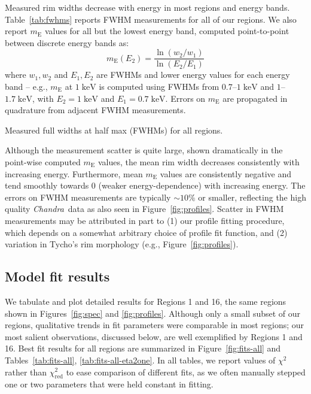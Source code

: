 \documentclass[iop, apj, numberedappendix]{emulateapj}
\newcommand*{\mt}{\mathrm}
\newcommand*{\unit}[1]{\;\mt{#1}}  %
\newcommand*{\abt}{\mathord{\sim}} %
\newcommand*{\Chandra}{\textit{Chandra}\ }
\newcommand*{\mE}{m_\mt{E}}
\begin{document}
Measured rim widths decrease with energy in most regions and energy bands.
Table~\ref{tab:fwhms} reports FWHM measurements for all of our regions.
We also report $\mE$ values for all but the lowest energy band, computed
point-to-point between discrete energy bands as:
\begin{equation}
    \mE(E_2) = \frac{\ln(w_2/w_1)}{\ln(E_2/E_1)}
\end{equation}
where $w_1, w_2$ and $E_1, E_2$ are FWHMs and lower energy values for each
energy band -- e.g., $\mE$ at $1 \unit{keV}$ is computed using FWHMs from
$0.7$--$1 \unit{keV}$ and $1$--$1.7 \unit{keV}$, with $E_2 = 1 \unit{keV}$ and
$E_1 = 0.7 \unit{keV}$.  Errors on $\mE$ are propagated in quadrature from
adjacent FWHM measurements.

\begin{table*}
    \iftoggle{manuscript}{
        \tiny
    }{
        \scriptsize
    }
    \centering
    \caption{Measured full widths at half max (FWHMs) for all regions.
             \label{tab:fwhms}}
    
\end{table*}

Although the measurement scatter is quite large, shown dramatically in the
point-wise computed $\mE$ values, the mean rim width decreases consistently
with increasing energy.  Furthermore, mean $\mE$ values are consistently
negative and tend smoothly towards $0$ (weaker energy-dependence) with
increasing energy.  The errors on FWHM measurements are typically $\abt 10\%$
or smaller, reflecting the high quality \Chandra data as also seen in
Figure~\ref{fig:profiles}.  Scatter in FWHM measurements may be attributed in
part to (1) our profile fitting procedure, which depends on a somewhat
arbitrary choice of profile fit function, and (2) variation in Tycho's rim
morphology (e.g., Figure~\ref{fig:profiles}).

\subsection{Model fit results}
\label{sec:fit-results}

We tabulate and plot detailed results for Regions 1 and 16, the same regions
shown in Figures~\ref{fig:spec} and \ref{fig:profiles}.  Although only a small
subset of our regions, qualitative trends in fit parameters were comparable in
most regions; our most salient observations, discussed below, are well
exemplified by Regions 1 and 16.  Best fit results for all regions are
summarized in Figure~\ref{fig:fits-all} and Tables~\ref{tab:fits-all},
\ref{tab:fits-all-eta2one}.  In all tables, we report values of $\chi^2$ rather
than $\chi^2_\mt{red}$ to ease comparison of different fits, as we often
manually stepped one or two parameters that were held constant in fitting.
\end{document}
